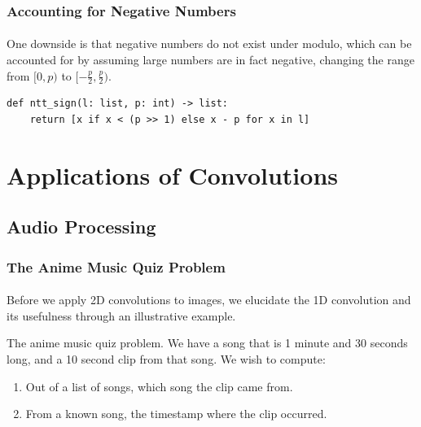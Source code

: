 \documentclass{beamer}                             %
\begin{document}
\begin{frame}[fragile]
\frametitle{Accounting for Negative Numbers}
\framesubtitle{}
One downside is that negative numbers do not exist under modulo, which can
be accounted for by assuming large numbers are in fact negative,
changing the range from \( [0, p) \) to \( [-\frac{p}{2}, \frac{p}{2}) \).
\begin{verbatim}
def ntt_sign(l: list, p: int) -> list:
    return [x if x < (p >> 1) else x - p for x in l]
\end{verbatim}
\end{frame}

\section[Applications]{Applications of Convolutions}
\subsection[Audio]{Audio Processing}
\begin{frame}
\frametitle{The Anime Music Quiz Problem}
\framesubtitle{}
Before we apply 2D convolutions to images, we elucidate the 1D convolution
and its usefulness through an illustrative example.
\begin{exampleblock}{The anime music quiz problem.}
We have a song that is 1 minute and 30 seconds long,
and a 10 second clip from that song. We wish to compute:
\begin{enumerate}
  \item<2-> Out of a list of songs, which song the clip came from.
  \item<3-> From a known song, the timestamp where the clip occurred.
\end{enumerate}
\end{exampleblock}
\end{frame}
\end{document}
